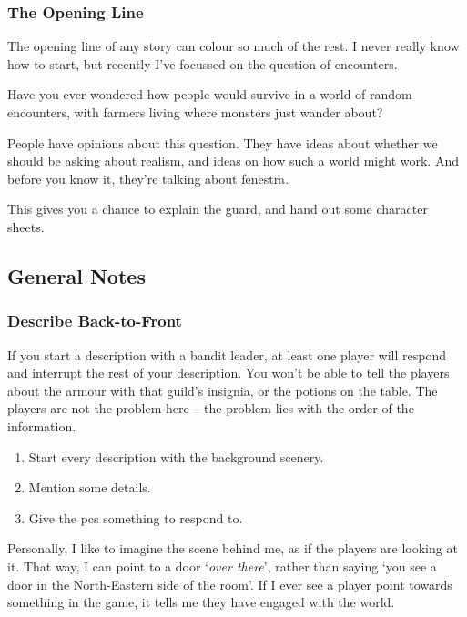 \begin{multicols}{2}
\subsubsection{The Opening Line}

The opening line of any story can colour so much of the rest.
I never really know how to start, but recently I've focussed on the question of encounters.

\begin{speechtext}
  Have you ever wondered how people would survive in a world of random encounters, with farmers living where monsters just wander about?
\end{speechtext}

People have opinions about this question.
They have ideas about whether we should be asking about realism, and ideas on how such a world might work.
And before you know it, they're talking about \gls{fenestra}.

This gives you a chance to explain the \gls{guard}, and hand out some character sheets.

\subsection{General Notes}

\subsubsection{Describe Back-to-Front}

If you start a description with a bandit leader, at least one player will respond and interrupt the rest of your description.
You won't be able to tell the players about the armour with that guild's insignia, or the potions on the table.
The players are not the problem here -- the problem lies with the order of the information.

\begin{enumerate}
  \item
  Start every description with the background scenery.
  \item
  Mention some details.
  \item
  Give the \glspl{pc} something to respond to.
\end{enumerate}

\noindent
Personally, I like to imagine the scene behind me, as if the players are looking at it.
That way, I can point to a door `\emph{over there}', rather than saying `you see a door in the North-Eastern side of the room'.
If I ever see a player point towards something in the game, it tells me they have engaged with the world.


\end{multicols}
